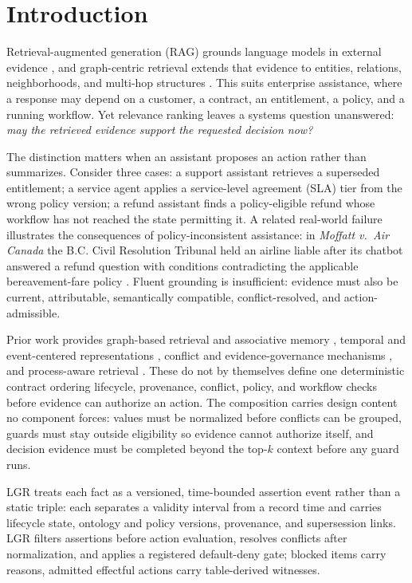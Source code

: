 \documentclass[conference]{IEEEtran}
\newcommand{\lgr}{\textsc{LGR}\xspace}
\begin{document}
\section{Introduction}
\label{sec:intro}
Retrieval-augmented generation (RAG) grounds language models in external evidence \cite{lewis2020rag}, and graph-centric retrieval extends that evidence to entities, relations, neighborhoods, and multi-hop structures \cite{graphrag,kg2rag,graphflow,gretriever}. This suits enterprise assistance, where a response may depend on a customer, a contract, an entitlement, a policy, and a running workflow. Yet relevance ranking leaves a systems question unanswered: \emph{may the retrieved evidence support the requested decision now?}

The distinction matters when an assistant proposes an action rather than summarizes. Consider three cases: a support assistant retrieves a superseded entitlement; a service agent applies a service-level agreement (SLA) tier from the wrong policy version; a refund assistant finds a policy-eligible refund whose workflow has not reached the state permitting it. A related real-world failure illustrates the consequences of policy-inconsistent assistance: in \emph{Moffatt v.\ Air Canada} the B.C. Civil Resolution Tribunal held an airline liable after its chatbot answered a refund question with conditions contradicting the applicable bereavement-fare policy \cite{aircanada}. Fluent grounding is insufficient: evidence must also be current, attributable, semantically compatible, conflict-resolved, and action-admissible.

Prior work provides graph-based retrieval and associative memory \cite{graphrag,kg2rag,hipporag}, temporal and event-centered representations \cite{graphiti,e2rag,tgrag,kgirag,knowevolve}, conflict and evidence-governance mechanisms \cite{tgragconflict,truthfulrag,ledgerrag}, and process-aware retrieval \cite{grag4pm,a2jrag}. These do not by themselves define one deterministic contract ordering lifecycle, provenance, conflict, policy, and workflow checks before evidence can authorize an action. The composition carries design content no component forces: values must be normalized before conflicts can be grouped, guards must stay outside eligibility so evidence cannot authorize itself, and decision evidence must be completed beyond the top-$k$ context before any guard runs.

\lgr treats each fact as a versioned, time-bounded assertion event rather than a static triple: each separates a validity interval from a record time and carries lifecycle state, ontology and policy versions, provenance, and supersession links. \lgr filters assertions before action evaluation, resolves conflicts after normalization, and applies a registered default-deny gate; blocked items carry reasons, admitted effectful actions carry table-derived witnesses.
\end{document}
